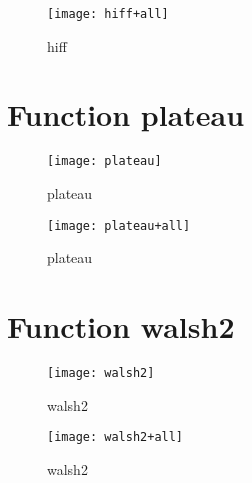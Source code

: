 \begin{figure}[h]
\begin{center}
\texttt{[image: hiff+all]}
\caption{hiff}
\end{center}
\end{figure}

\newpage

\section{Function plateau}

\begin{center}

\end{center}

\begin{center}

\end{center}

\begin{figure}[h]
\begin{center}
\texttt{[image: plateau]}
\caption{plateau}
\end{center}
\end{figure}

\begin{figure}[h]
\begin{center}
\texttt{[image: plateau+all]}
\caption{plateau}
\end{center}
\end{figure}

\newpage

\section{Function walsh2}

\begin{center}

\end{center}

\begin{center}

\end{center}

\begin{figure}[h]
\begin{center}
\texttt{[image: walsh2]}
\caption{walsh2}
\end{center}
\end{figure}

\begin{figure}[h]
\begin{center}
\texttt{[image: walsh2+all]}
\caption{walsh2}
\end{center}
\end{figure}

